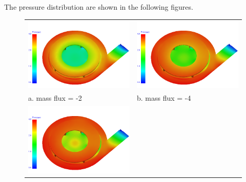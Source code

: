 \documentclass[letterpaper,12pt]{article}
\begin{document}
The pressure distribution are shown in the following figures.
\\
\begin{figure}[!h!tbp]
\begin{center}
\begin{tabular}{ p{7cm} p{7cm} }
\includegraphics[scale=0.263157894737]{./Figures/Image_2.png}
 & \includegraphics[scale=0.263157894737]{./Figures/Image_3.png}
 \\ a. mass flux = -2 & b. mass flux = -4 \\
\includegraphics[scale=0.263157894737]{./Figures/Image_4.png}

\end{tabular}
\end{center}
\end{figure}
\end{document}
